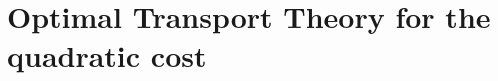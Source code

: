 \documentclass[reqno,12pt]{article}
\begin{document}
\section{Optimal Transport Theory for the quadratic cost}
\end{document}
